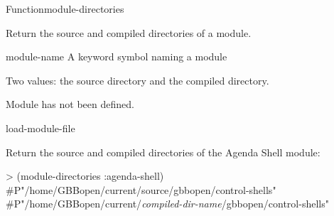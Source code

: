 \documentclass[10pt,twoside,english,pdftex]{article}
\begin{document}
\begin{functiondoc}{Function}{module-directories}{
    \returns{} \mbox{}}
%
%

\fnsyntax 

\fnpurpose Return the source and compiled directories of a module.

\fnpackage {}

\fnmodule {}

\fnargs
\begin{args}{module-name}
 A keyword symbol naming a module 
\end{args}

\fnreturns Two values: the source directory and the compiled directory.

\fnerrors
Module  has not been defined.

\begin{alsos}{load-module-file}
\end{alsos}

\fnexample
Return the source and compiled directories of the Agenda Shell module:
\begin{example}
> (module-directories :agenda-shell)
#P"/home/GBBopen/current/source/gbbopen/control-shells"
#P"/home/GBBopen/current/\textit{compiled-dir-name\/}/gbbopen/control-shells"
\end{example} 

\end{functiondoc}

\end{document}

